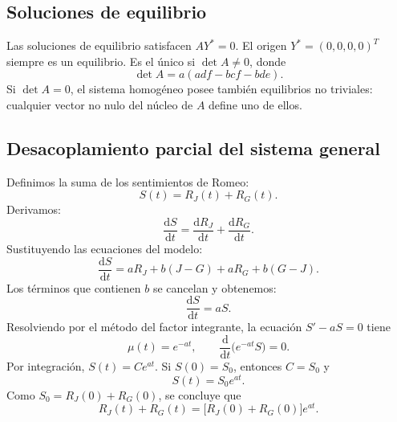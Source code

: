 \documentclass[10pt,letterpaper]{article}
\newcommand{\RJ}{R_{J}}
\newcommand{\RG}{R_{G}}
\newcommand{\dd}{\mathrm{d}}
\begin{document}
\subsection{Soluciones de equilibrio}
Las soluciones de equilibrio satisfacen $AY^*=0$. El origen $Y^*=(0,0,0,0)^T$ siempre es un equilibrio. Es el único si $\det A\ne0$, donde
\begin{equation}\label{eq:detA}
\boxed{\det A=a(adf-bcf-bde).}
\end{equation}
Si $\det A=0$, el sistema homogéneo posee también equilibrios no triviales: cualquier vector no nulo del núcleo de $A$ define uno de ellos.

\subsection{Desacoplamiento parcial del sistema general}
Definimos la suma de los sentimientos de Romeo:
\begin{equation}\label{eq:defS}
S(t)=\RJ(t)+\RG(t).
\end{equation}
Derivamos:
\begin{equation}
\frac{\dd S}{\dd t}=\frac{\dd \RJ}{\dd t}+\frac{\dd \RG}{\dd t}.
\end{equation}
Sustituyendo las ecuaciones del modelo:
\begin{equation}
\frac{\dd S}{\dd t}=a\RJ+b(J-G)+a\RG+b(G-J).
\end{equation}
Los términos que contienen $b$ se cancelan y obtenemos:
\begin{equation}\label{eq:Sprime}
\boxed{\frac{\dd S}{\dd t}=aS.}
\end{equation}
Resolviendo por el método del factor integrante, la ecuación $S'-aS=0$ tiene
\begin{equation}
\mu(t)=e^{-at},\qquad
\frac{\dd}{\dd t}\bigl(e^{-at}S\bigr)=0.
\end{equation}
Por integración, $S(t)=Ce^{at}$. Si $S(0)=S_0$, entonces $C=S_0$ y
\begin{equation}\label{eq:solS}
\boxed{S(t)=S_0e^{at}.}
\end{equation}
Como $S_0=\RJ(0)+\RG(0)$, se concluye que
\begin{equation}\label{eq:sumainicial}
\boxed{\RJ(t)+\RG(t)=\bigl[\RJ(0)+\RG(0)\bigr]e^{at}.}
\end{equation}
\end{document}
